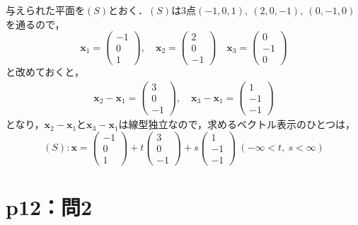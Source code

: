 \documentclass[a4paper,10pt,fleqn]{ltjsarticle}
\begin{document}
\begin{tleftbar}
  与えられた平面を$(S)$とおく．$(S)$は3点$(-1,0,1),~(2,0,-1),~(0,-1,0)$を通るので，
  \begin{equation*}
    \bm{x}_1=
    \begin{pmatrix}
      -1 \\
      0  \\
      1
    \end{pmatrix}
    ,\quad \bm{x}_2=
    \begin{pmatrix}
      2 \\
      0 \\
      -1
    \end{pmatrix}
    \quad
    \bm{x}_3=
    \begin{pmatrix}
      0  \\
      -1 \\
      0
    \end{pmatrix}
  \end{equation*}
  と改めておくと，
  \begin{gather*}
    \bm{x}_2 - \bm{x}_1 =
    \begin{pmatrix}
      3 \\
      0 \\
      -1
    \end{pmatrix}
    ,\quad
    \bm{x}_3 - \bm{x}_1 =
    \begin{pmatrix}
      1  \\
      -1 \\
      -1
    \end{pmatrix}
  \end{gather*}
  となり，$\bm{x}_2 - \bm{x}_1$と$\bm{x}_3 - \bm{x}_1$は線型独立なので，求めるベクトル表示のひとつは，
  \[
    (S) \colon \bm{x}=
    \begin{pmatrix}
      -1 \\
      0  \\
      1
    \end{pmatrix}
    + t
    \begin{pmatrix}
      3 \\
      0 \\
      -1
    \end{pmatrix}
    +s
    \begin{pmatrix}
      1  \\
      -1 \\
      -1
    \end{pmatrix}
    ~( -\infty < t,~s<\infty)
  \]
\end{tleftbar}
%
%
%
%
\section*{p12：問2}
\end{document}
